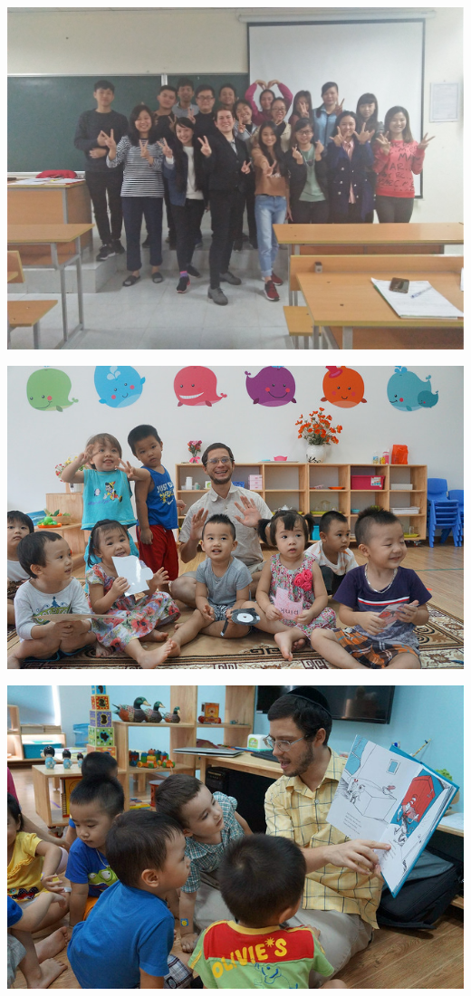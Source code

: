 \documentclass[11pt]{article}
\begin{document}
\begin{center}
\includegraphics[width=.9\linewidth]{./images/cheers1.jpg}
\end{center}
\begin{center}
\includegraphics[width=.9\linewidth]{./images/kindyClass.jpg}
\end{center}
\begin{center}
\includegraphics[width=.9\linewidth]{./images/kindyBook.jpg}
\end{center}
\end{document}
